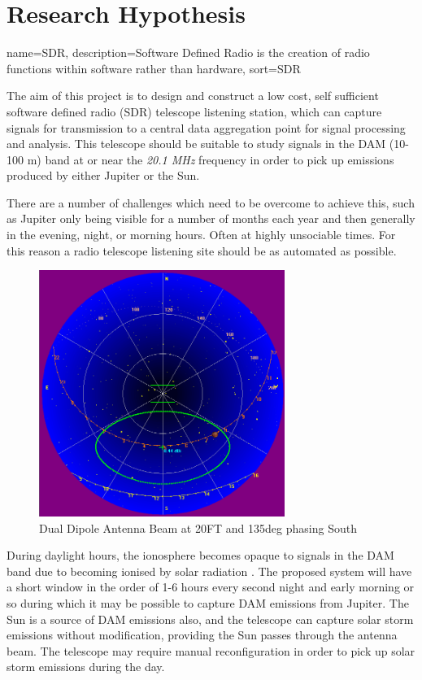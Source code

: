 \documentclass[runningheads,a4paper]{llncs}
\begin{document}
%
\newpage
\section*{Research Hypothesis}
%
{
  name={SDR},
  description={Software Defined Radio is the creation of radio functions within software rather than hardware},
  sort=SDR
}

The aim of this project is to design and construct a low cost, self sufficient software defined radio (\gls{SDR}) telescope listening station, which can capture signals for transmission to a central data aggregation point for signal processing and analysis. This telescope should be suitable to study signals  in the \gls{DAM} (10-100 m) band at or near the \textit{20.1 MHz} frequency in order to pick up emissions produced by either Jupiter or the Sun.

There are a number of challenges which need to be overcome to achieve this, such as Jupiter only being visible for a number of months each year and then generally in the evening, night, or morning hours. Often at highly unsociable times. For this reason a radio telescope listening site should be as automated as possible.

%
\begin{figure}[here]
\centering
\includegraphics[width=8cm]{images/07}
\caption{Dual Dipole Antenna Beam at 20FT and 135deg phasing South \citep{nasa12}}
\label{fig:dual_dipole_20ft_135phasing_s}
\end{figure}
%

During daylight hours, the ionosphere becomes opaque to signals in the \gls{DAM} band due to becoming ionised by solar radiation \citep{nasa-ionosphere-12}. The proposed system will have a short window in the order of 1-6 hours every second night and early morning or so during which it may be possible to capture \gls{DAM} emissions from Jupiter. The Sun is a source of \gls{DAM} emissions also, and the telescope can capture solar storm emissions without modification, providing the Sun passes through the antenna beam. The telescope may require manual reconfiguration in order to pick up solar storm emissions during the day.
\end{document}

